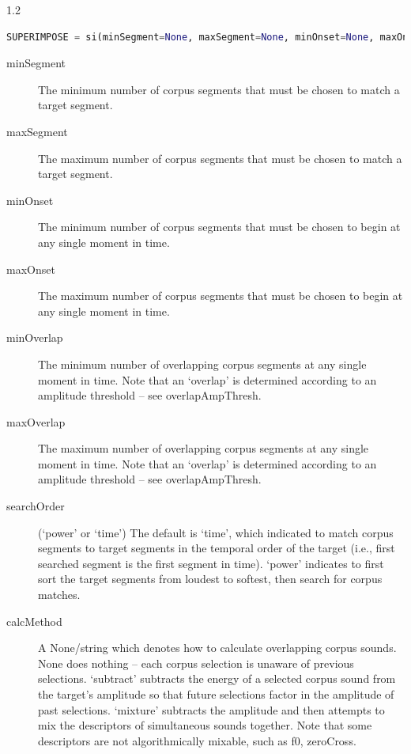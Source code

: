 \documentclass{article}
\begin{document}
\begin{spacing}{1.2}
 \begin{lstlisting}[language=python]
SUPERIMPOSE = si(minSegment=None, maxSegment=None, minOnset=None, maxOnset=8, minOverlap=None, maxOverlap=None, searchOrder='power', calcMethod='mixture', peakAlign=False)
\end{lstlisting}
 
\begin{description}

\item[minSegment] The minimum number of corpus segments that must be chosen to match a target segment.
\item[maxSegment] The maximum number of corpus segments that must be chosen to match a target segment.
\item[minOnset] The minimum number of corpus segments that must be chosen to begin at any single moment in time.
\item[maxOnset] The maximum number of corpus segments that must be chosen to begin at any single moment in time.
\item[minOverlap] The minimum number of overlapping corpus segments at any single moment in time.  Note that an `overlap' is determined according to an amplitude threshold -- see overlapAmpThresh.
\item[maxOverlap] The maximum number of overlapping corpus segments at any single moment in time.  Note that an `overlap' is determined according to an amplitude threshold -- see overlapAmpThresh.

\item[searchOrder] (`power' or `time')  The default is `time', which indicated to match corpus segments to target segments in the temporal order of the target (i.e., first searched segment is the first segment in time).  `power' indicates to first sort the target segments from loudest to softest, then search for corpus matches.

\item[calcMethod] A None/string which denotes how to calculate overlapping corpus sounds.  None does nothing -- each corpus selection is unaware of previous selections.  `subtract' subtracts the energy of a selected corpus sound from the target's amplitude so that future selections factor in the amplitude of past selections.  `mixture' subtracts the amplitude and then attempts to mix the descriptors of simultaneous sounds together.  Note that some descriptors are not algorithmically mixable, such as f0, zeroCross.
\end{description}





\end{spacing}
\end{document}
